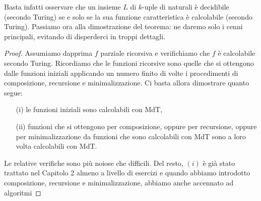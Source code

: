 Basta infatti osservare che un insieme $L$ di $k$-uple di naturali è decidibile
(secondo Turing) se e solo se la sua funzione caratteristica è calcolabile
(secondo Turing). Passiamo ora alla dimostrazione del teorema: ne daremo solo i
cenni principali, evitando di disperderci in troppi dettagli.

\begin{proof}
    Assumiamo dapprima $f$ parziale ricorsiva e verifichiamo che $f$
    è calcolabile secondo Turing. Ricordiamo che le funzioni ricorsive sono quelle
    che si ottengono dalle funzioni iniziali applicando un numero finito di volte
    $\mathrm{i}$ procedimenti di composizione, recursione e minimalizzazione. Ci
    basta allora dimostrare quanto segue:

    \begin{enumerate}
        \item[(i)] le funzioni iniziali sono calcolabili
            con MdT,
        \item[(ii)] funzioni che si ottengono per composizione, oppure per recursione,
            oppure per minimalizzazione da funzioni che sono calcolabili con MdT sono a loro
            volta calcolabili con MdT.
    \end{enumerate}

    Le relative verifiche sono più noiose che difficili. Del resto, $(i)$ è già
    stato trattato nel Capitolo 2 almeno a livello di esercizi e quando abbiamo
    introdotto composizione, recursione e minimalizzazione, abbiamo anche accennato
    ad algoritmi
\end{proof}
